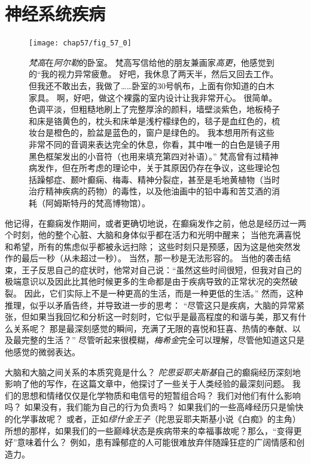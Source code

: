 \part{神经系统疾病}

\begin{figure}[htbp]
	\centering
	\texttt{[image: chap57/fig\_57\_0]}
	\caption{\textit{梵高}在\textit{阿尔勒}的卧室。
		梵高写信给他的朋友兼画家\textit{高更}，他感觉到的“我的视力异常疲惫。
		好吧，我休息了两天半，然后又回去工作。
		但我还不敢出去，我做了……卧室的30号帆布，上面有你知道的白木家具。
		啊，好吧，做这个裸露的室内设计让我非常开心。
		很简单。
		色调平淡，但粗糙地刷上了完整厚涂的颜料，墙壁淡紫色，地板椅子和床是铬黄色的，枕头和床单是浅柠檬绿色的，毯子是血红色的，梳妆台是橙色的，脸盆是蓝色的，窗户是绿色的。
		我本想用所有这些非常不同的音调来表达完全的休息，你看，其中唯一的白色是镜子用黑色框架发出的小音符（也用来填充第四对补语）。”
		梵高曾有过精神病发作，但在所考虑的理论中，关于其原因仍存在争议，这些理论包括躁郁症、颞叶癫痫、梅毒、精神分裂症，甚至是毛地黄植物（当时治疗精神疾病的药物）的毒性，以及他油画中的铅中毒和苦艾酒的消耗（阿姆斯特丹的梵高博物馆）。}
	\label{fig:59_0}
\end{figure}


他记得，在癫痫发作期间，或者更确切地说，在癫痫发作之前，他总是经历过一两个时刻，他的整个心脏、大脑和身体似乎都在活力和光明中醒来；
当他充满喜悦和希望，所有的焦虑似乎都被永远扫除；
这些时刻只是预感，因为这是他突然发作的最后一秒（从未超过一秒）。
当然，那一秒是无法形容的。
当他的袭击结束，王子反思自己的症状时，他常对自己说：“虽然这些时间很短，但我对自己的极端意识以及因此比其他时候更多的生命都是由于疾病导致的正常状况的突然破裂。
因此，它们实际上不是一种更高的生活，而是一种更低的生活。”
然而，这种推理，似乎以矛盾告终，并导致进一步的思考：
“尽管这只是疾病，大脑的异常紧张，但如果当我回忆和分析这一时刻时，它似乎是最高程度的和谐与美，那又有什么关系呢？
那是最深刻感觉的瞬间，充满了无限的喜悦和狂喜、热情的奉献、以及最完整的生活？”
尽管听起来很模糊，\textit{梅希金}完全可以理解，尽管他知道这只是他感觉的微弱表达。


大脑和大脑之间关系的本质究竟是什么？
\textit{陀思妥耶夫斯基}自己的癫痫经历深刻地影响了他的写作，在这篇文章中，他探讨了一些关于人类经验的最深刻问题。
我们的思想和情绪仅仅是化学物质和电信号的短暂组合吗？
我们对他们有什么影响吗？
如果没有，我们能为自己的行为负责吗？
如果我们的一些高峰经历只是愉快的化学事故呢？
或者，正如\textit{缪什金王子}（陀思妥耶夫斯基小说《白痴》的主角）所想的那样，如果我们的一些巅峰状态是疾病带来的幸福事故呢？那么，“变得更好”意味着什么？
例如，患有躁郁症的人可能很难放弃伴随躁狂症的广阔情感和创造力。


